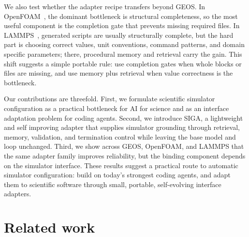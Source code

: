 \documentclass{article}
\begin{document}
We also test whether the adapter recipe transfers beyond GEOS. In OpenFOAM~\citep{weller1998tensorial}, the dominant bottleneck is structural completeness, so the most useful component is the completion gate that prevents missing required files. In LAMMPS~\citep{LAMMPS}, generated scripts are usually structurally complete, but the hard part is choosing correct values, unit conventions, command patterns, and domain specific parameters; there, procedural memory and retrieval carry the gain. This shift suggests a simple portable rule: use completion gates when whole blocks or files are missing, and use memory plus retrieval when value correctness is the bottleneck.

Our contributions are threefold. First, we formulate scientific simulator configuration as a practical bottleneck for AI for science and as an interface adaptation problem for coding agents. Second, we introduce SIGA, a lightweight and self improving adapter that supplies simulator grounding through retrieval, memory, validation, and termination control while leaving the base model and loop unchanged. Third, we show across GEOS, OpenFOAM, and LAMMPS that the same adapter family improves reliability, but the binding component depends on the simulator interface. These results suggest a practical route to automatic simulator configuration: build on today’s strongest coding agents, and adapt them to scientific software through small, portable, self-evolving interface adapters.





\section{Related work}
\label{sec:related}
\end{document}

